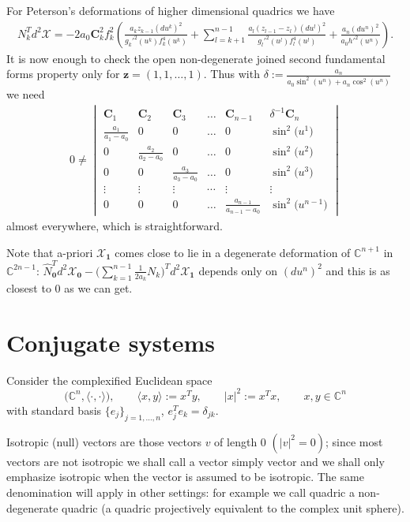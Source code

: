 \documentclass[pdftex]{sigma}
\begin{document}
For Peterson's deformations of higher dimensional quadrics we have
\begin{gather*}
N_k^Td^2\mathcal{X}=
-2a_0\mathbf{C}_k^2f_k^2\left(\frac{a_kz_{k-1}(du^k)^2}{g_k'^2(u^k)f_k^4(u^k)}
+\sum_{l=k+1}^{n-1}\frac{a_l(z_{l-1}-z_l)(du^l)^2}{g_l'^2(u^l)f_l^4(u^l)}
+\frac{a_n(du^n)^2}{a_0h'^2(u^n)}\right).
\end{gather*}
It is now enough to check the open non-degenerate joined second
fundamental forms property only for $\mathbf{z}=(1,1,\dots ,1)$. Thus
with $\delta:=\frac{a_n}{a_0\sin^2(u^n)+a_n\cos^2(u^n)}$ we need
\begin{gather*}
0\neq\begin{vmatrix}
\mathbf{C}_1&\mathbf{C}_2&\mathbf{C}_3&\dots &\mathbf{C}_{n-1}&\delta^{-1}\mathbf{C}_n\\
\frac{a_1}{a_1-a_0}&0&0&\dots &0&\sin^2\big(u^1\big)\\
0&\frac{a_2}{a_2-a_0}&0&\dots &0&\sin^2\big(u^2\big)\\
0&0&\frac{a_3}{a_3-a_0}&\dots &0&\sin^2\big(u^3\big)\\
\vdots&\vdots&\vdots&\cdots&\vdots&\vdots\\
0&0&0&\dots &\frac{a_{n-1}}{a_{n-1}-a_0}&\sin^2\big(u^{n-1}\big)\end{vmatrix}
\end{gather*}
almost everywhere, which is straightforward.

\begin{remark}
Note that a-priori $\mathcal{X}_{\mathbf{1}}$ comes close to lie
in a degenerate deformation of $\mathbb{C}^{n+1}$ in
$\mathbb{C}^{2n-1}$:  $\hat
N_{\mathbf{0}}^Td^2\mathcal{X}_{\mathbf{0}}-
\big(\sum\limits_{k=1}^{n-1}\frac{1}{2a_k}N_k\big)^Td^2\mathcal{X}_{\mathbf{1}}$
depends only on $(du^n)^2$ and this is as closest to $0$ as we can
get.
\end{remark}

\section{Conjugate systems}\label{sec:pet3}

Consider the complexif\/ied Euclidean space
\[
\big(\mathbb{C}^n,\langle \cdot ,\cdot \rangle),\qquad \langle x,y\rangle :=x^Ty,\qquad |x|^2:=x^Tx,\qquad
x,y\in\mathbb{C}^n
\]
with standard basis $\{e_j\}_{j=1,\dots ,n}$, $
e_j^Te_k=\delta_{jk}.$

Isotropic (null) vectors are those vectors $v$ of length $0$  $(|v|^2=0)$; since most vectors are not isotropic we shall call a
vector simply vector and we shall only emphasize isotropic when
the vector is assumed to be isotropic. The same denomination will
apply in other settings: for example we call quadric a
non-degenerate quadric (a quadric projectively equivalent to the
complex unit sphere).
\end{document}

